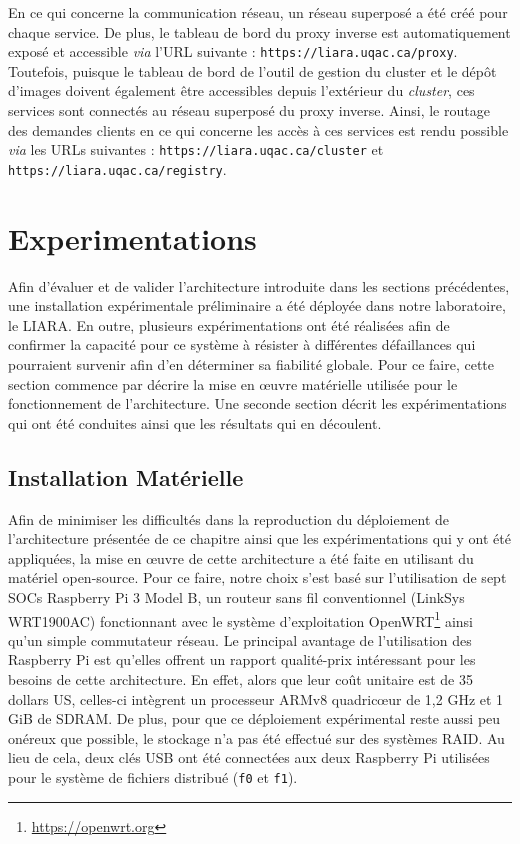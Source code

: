 En ce qui concerne la communication réseau, un réseau superposé a été créé pour chaque service. De plus, le tableau de bord du proxy inverse est automatiquement exposé et accessible \textit{via} l'\acs{URL} suivante : \texttt{https://liara.uqac.ca/proxy}. Toutefois, puisque le tableau de bord de l'outil de gestion du cluster et le dépôt d'images doivent également être accessibles depuis l'extérieur du \textit{cluster}, ces services sont connectés au réseau superposé du proxy inverse. Ainsi, le routage des demandes clients en ce qui concerne les accès à ces services est rendu possible \textit{via} les \acsp{URL} suivantes : \texttt{https://liara.uqac.ca/cluster} et \texttt{https://liara.uqac.ca/registry}.

\section{Experimentations}

Afin d'évaluer et de valider l'architecture introduite dans les sections précédentes, une installation expérimentale préliminaire a été déployée dans notre laboratoire, le \acs{LIARA}. En outre, plusieurs expérimentations ont été réalisées afin de confirmer la capacité pour ce système à résister à différentes défaillances qui pourraient survenir afin d'en déterminer sa fiabilité globale. Pour ce faire, cette section commence par décrire la mise en \oe{}uvre matérielle utilisée pour le fonctionnement de l'architecture. Une seconde section décrit les expérimentations qui ont été conduites ainsi que les résultats qui en découlent.

\subsection{Installation Matérielle}

Afin de minimiser les difficultés dans la reproduction du déploiement de l'architecture présentée de ce chapitre ainsi que les expérimentations qui y ont été appliquées, la mise en \oe{}uvre de cette architecture a été faite en utilisant du matériel open-source. Pour ce faire, notre choix s'est basé sur l'utilisation de sept \acsp{SOC} Raspberry Pi 3 Model B, un routeur sans fil conventionnel (LinkSys WRT1900AC) fonctionnant avec le système d'exploitation OpenWRT\footnote{\url{https://openwrt.org}} ainsi qu'un simple commutateur réseau. Le principal avantage de l'utilisation des Raspberry Pi est qu'elles offrent un rapport qualité-prix intéressant pour les besoins de cette architecture. En effet, alors que leur coût unitaire est de 35 dollars US, celles-ci intègrent un processeur ARMv8 quadric\oe{}ur de 1,2 GHz et 1 GiB de SDRAM. De plus, pour que ce déploiement expérimental reste aussi peu onéreux que possible, le stockage n'a pas été effectué sur des systèmes RAID. Au lieu de cela, deux clés USB ont été connectées aux deux Raspberry Pi utilisées pour le système de fichiers distribué (\texttt{f0} et \texttt{f1}).

